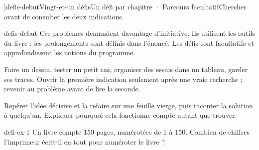 \editionPage[\pdfbookmark[0]{Défis d’approfondissement}{bm-defis-debut-parent}]{defis-debut}{Vingt-et-un défis}{Un défi par chapitre · Parcours facultatif}{Chercher avant de consulter les deux indications.}
\begin{blocEdition}{defis-debut}
Ces problèmes demandent davantage d’initiative. Ils utilisent les outils du livre ; les prolongements sont définis dans l’énoncé. Les défis sont facultatifs et approfondissent les notions du programme.\par\bigskip
\begin{savoirfaire}Faire un dessin, tester un petit cas, organiser des essais dans un tableau, garder ses traces. Ouvrir la première indication seulement après une vraie recherche ; revenir au problème avant de lire la seconde.\end{savoirfaire}
\begin{savoirfaire}Repérer l’idée décisive et la refaire sur une feuille vierge, puis raconter la solution à quelqu’un. Expliquer pourquoi cela fonctionne compte autant que trouver.\end{savoirfaire}
\end{blocEdition}
\begin{blocEdition}{defi-ex-1}
Un livre compte 150 pages, numérotées de 1 à 150. Combien de chiffres l’imprimeur écrit-il en tout pour numéroter le livre ?\par{}\par\par{}\par{}\par{}\par{}\par{}\par{}
\end{blocEdition}
